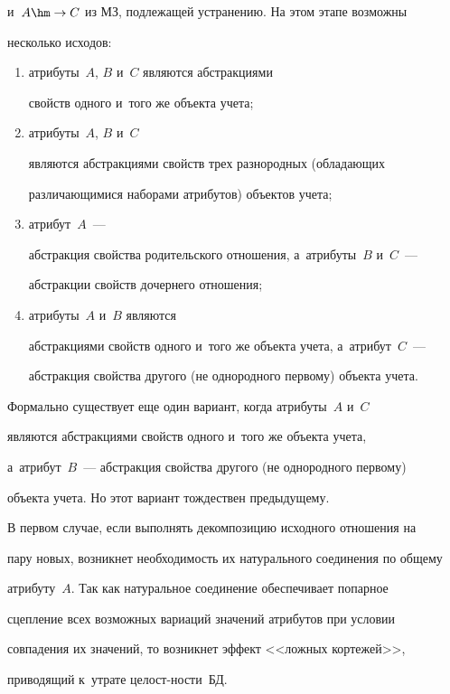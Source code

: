 и~$A\hm\to C$ из МЗ, подлежащей устранению. На этом этапе возможны 

несколько исходов: 

\begin{enumerate}[(1)]

\item атрибуты~$A$, $B$ и~$C$ являются абстракциями 

свойств одного и~того же объекта учета; 

\item атрибуты~$A$, $B$ и~$C$ 

являются абстракциями свойств трех разнородных (обладающих 

различающимися наборами атрибутов) объектов учета; 

\item атрибут~$A$~--- 

абстракция свойства родительского отношения, а~атрибуты~$B$ и~$C$~--- 

абстракции свойств дочернего отношения;

\item атрибуты~$A$ и~$B$ являются 

абстракциями свойств одного и~того же объекта учета, а~атрибут~$C$~--- 

абстракция свойства другого (не однородного первому) объекта учета.

\end{enumerate}

Формально существует еще один вариант, когда атрибуты~$A$ и~$C$ 

являются абстракциями свойств одного и~того же объекта учета, 

а~атрибут~$B$~--- абстракция свойства другого (не однородного первому) 

объекта учета. Но этот вариант тож\-дест\-вен предыду\-щему.

  

  В первом случае, если выполнять декомпозицию исходного отношения на 

пару новых, возникнет не\-об\-хо\-ди\-мость их натурального со\-еди\-не\-ния по общему 

атрибуту~$A$. Так как натуральное соединение обеспечивает попарное 

сцепление всех возможных вариаций значений атрибутов при условии 

совпадения их значений, то возникнет эффект <<лож\-ных кортежей>>, 

приводящий к~утра\-те це\-лост-\linebreak ности~БД. 

